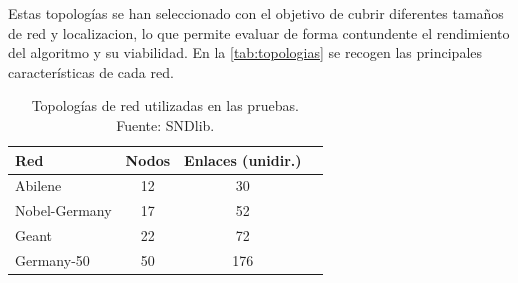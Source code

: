 Estas topologías se han seleccionado con el objetivo de cubrir diferentes tamaños de red y localizacion, lo que permite evaluar de forma contundente el rendimiento del algoritmo y su viabilidad. En la \autoref{tab:topologias} se recogen las principales características de cada red.

\begin{table}[h]
    \centering
    \captionsetup{justification=centering}
    \begin{tabular}{|l|c|c|l|}
        \hline
        \textbf{Red} & \textbf{Nodos} & \textbf{Enlaces (unidir.)} \\
        \hline
        Abilene & 12 & 30 \\
        Nobel-Germany & 17 & 52 \\
        Geant & 22 & 72 \\
        Germany-50 & 50 & 176 \\
        \hline
    \end{tabular}
    \caption[Detalles topologías]{Topologías de red utilizadas en las pruebas.\\Fuente: SNDlib.}
    \label{tab:topologias}
\end{table}



